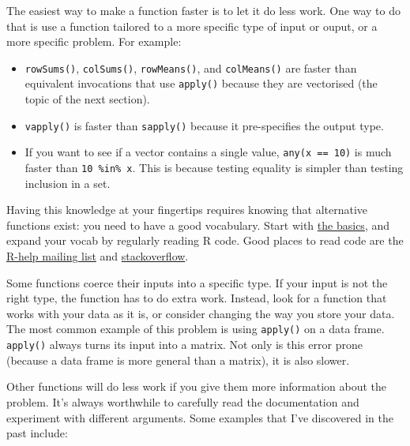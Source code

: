 
The easiest way to make a function faster is to let it do less work. One
way to do that is use a function tailored to a more specific type of
input or ouput, or a more specific problem. For example:

\begin{itemize}
\item
  \texttt{rowSums()}, \texttt{colSums()}, \texttt{rowMeans()}, and
  \texttt{colMeans()} are faster than equivalent invocations that use
  \texttt{apply()} because they are vectorised (the topic of the next
  section).
\item
  \texttt{vapply()} is faster than \texttt{sapply()} because it
  pre-specifies the output type.
\item
  If you want to see if a vector contains a single value,
  \texttt{any(x == 10)} is much faster than \texttt{10 \%in\% x}. This
  is because testing equality is simpler than testing inclusion in a
  set.
\end{itemize}

Having this knowledge at your fingertips requires knowing that
alternative functions exist: you need to have a good vocabulary. Start
with \hyperref[vocabulary]{the basics}, and expand your vocab by
regularly reading R code. Good places to read code are the
\href{https://stat.ethz.ch/mailman/listinfo/r-help}{R-help mailing list}
and \href{http://stackoverflow.com/questions/tagged/r}{stackoverflow}.

Some functions coerce their inputs into a specific type. If your input
is not the right type, the function has to do extra work. Instead, look
for a function that works with your data as it is, or consider changing
the way you store your data. The most common example of this problem is
using \texttt{apply()} on a data frame. \texttt{apply()} always turns
its input into a matrix. Not only is this error prone (because a data
frame is more general than a matrix), it is also slower.

Other functions will do less work if you give them more information
about the problem. It's always worthwhile to carefully read the
documentation and experiment with different arguments. Some examples
that I've discovered in the past include:

